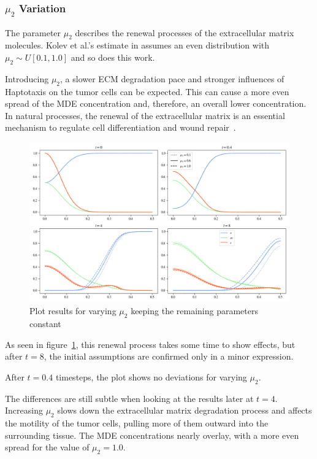 \subsubsection*{$\mu_2$ Variation}
The parameter $\mu_2$ describes the renewal processes of the extracellular matrix molecules. Kolev et al.'s estimate in \cite{Kolev2010} assumes an even distribution with $\mu_2 \sim U[0.1, 1.0]$ and so does this work. 

Introducing $\mu_2$, a slower ECM degradation pace and stronger influences of Haptotaxis on the tumor cells can be expected. This can cause a more even spread of the MDE concentration and, therefore, an overall lower concentration.
In natural processes, the renewal of the extracellular matrix is an essential mechanism to regulate cell differentiation and wound repair~\cite{Lu2011-yt}.
\begin{figure}[h!]
 \centering
 \includegraphics[width=\textwidth]{resources/images/prolif_mu_2_variation.png}
 \caption{Plot results for varying $\mu_2$ keeping the remaining parameters constant}
 \label{fig:prolif_mu_2_variation}
\end{figure}
As seen in figure~\ref{fig:prolif_mu_2_variation}, this renewal process takes some time to show effects, but after $t=8$, the initial assumptions are confirmed only in a minor expression. 

After $t=0.4$ timesteps, the plot shows no deviations for varying $\mu_2$.

The differences are still subtle when looking at the results later at $t=4$. Increasing $\mu_2$ slows down the extracellular matrix degradation process and affects the motility of the tumor cells, pulling more of them outward into the surrounding tissue. The MDE concentrations nearly overlay, with a more even spread for the value of $\mu_2=1.0$.

